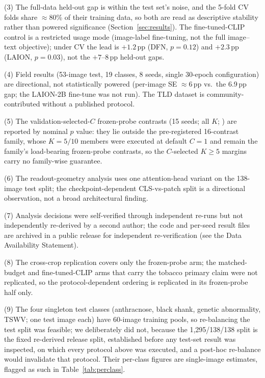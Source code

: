\documentclass[10pt,a4paper]{article}
\begin{document}
(3) The full-data held-out gap is within the test set's noise, and the 5-fold CV folds share $\approx$80\% of their training data, so both are read as descriptive stability rather than powered significance (Section~\ref{sec:results}). The fine-tuned-CLIP control is a restricted usage mode (image-label fine-tuning, not the full image--text objective); under CV the lead is $+1.2$\,pp (DFN, $p{=}0.12$) and $+2.3$\,pp (LAION, $p{=}0.03$), not the $+7$--$8$\,pp held-out gaps.

(4) Field results (53-image test, 19 classes, 8 seeds, single 30-epoch configuration) are directional, not statistically powered (per-image SE $\approx$6\,pp vs.\ the 6.9\,pp gap; the LAION-2B fine-tune was not run). The TLD dataset is community-contributed without a published protocol.

(5) The validation-selected-$C$ frozen-probe contrasts (15 seeds; all $K$; ) are reported by nominal $p$ value: they lie outside the pre-registered 16-contrast family, whose $K{=}5/10$ members were executed at default $C{=}1$ and remain the family's load-bearing frozen-probe contrasts, so the $C$-selected $K{\geq}5$ margins carry no family-wise guarantee.

(6) The readout-geometry analysis uses one attention-head variant on the 138-image test split; the checkpoint-dependent CLS-vs-patch split is a directional observation, not a broad architectural finding.

(7) Analysis decisions were self-verified through independent re-runs but not independently re-derived by a second author; the code and per-seed result files are archived in a public release for independent re-verification (see the Data Availability Statement).

(8) The cross-crop replication covers only the frozen-probe arm; the matched-budget and fine-tuned-CLIP arms that carry the tobacco primary claim were not replicated, so the protocol-dependent ordering is replicated in its frozen-probe half only.

(9) The four singleton test classes (anthracnose, black shank, genetic abnormality, TSWV; one test image each) have 60-image training pools, so re-balancing the test split was feasible; we deliberately did not, because the 1{,}295/138/138 split is the fixed re-derived release split, established before any test-set result was inspected, on which every protocol above was executed, and a post-hoc re-balance would invalidate that protocol. Their per-class figures are single-image estimates, flagged as such in Table~\ref{tab:perclass}.
\end{document}
